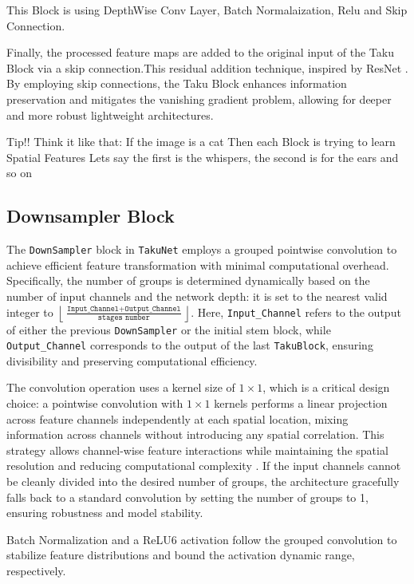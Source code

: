    This Block is using DepthWise Conv Layer, Batch Normalaization, Relu and Skip Connection.

    Finally, the processed feature maps are added to the original input of the Taku Block via a skip connection.This residual addition technique, inspired by ResNet \cite{zhou2021resnext}.
    By employing skip connections, the Taku Block enhances information preservation and mitigates the vanishing gradient problem, allowing for deeper and more robust lightweight architectures.

Tip!!
Think it like that: If the image is a cat
Then each Block is trying to learn Spatial Features
Lets say the first is the whispers, the second is for the ears and so on

\subsection{Downsampler Block}
The \texttt{DownSampler} block in \texttt{TakuNet} employs a grouped pointwise convolution to achieve efficient feature transformation with minimal computational overhead. Specifically, the number of groups is determined dynamically based on the number of input channels and the network depth: it is set to the nearest valid integer to $\left\lfloor \frac{\texttt{Input\_Channel} + \texttt{Output\_Channel}}{\texttt{stages number}} \right\rfloor$. Here, \texttt{Input\_Channel} refers to the output of either the previous \texttt{DownSampler} or the initial stem block, while \texttt{Output\_Channel} corresponds to the output of the last \texttt{TakuBlock}, ensuring divisibility and preserving computational efficiency.

The convolution operation uses a kernel size of $1 \times 1$, which is a critical design choice: a pointwise convolution with $1 \times 1$ kernels performs a linear projection across feature channels independently at each spatial location, mixing information across channels without introducing any spatial correlation. 
This strategy allows channel-wise feature interactions while maintaining the spatial resolution and reducing computational complexity \cite{PointwiseGroupedCon}.
If the input channels cannot be cleanly divided into the desired number of groups, the architecture gracefully falls back to a standard convolution by setting the number of groups to 1, ensuring robustness and model stability.

Batch Normalization and a ReLU6 activation follow the grouped convolution to stabilize feature distributions and bound the activation dynamic range, respectively.

